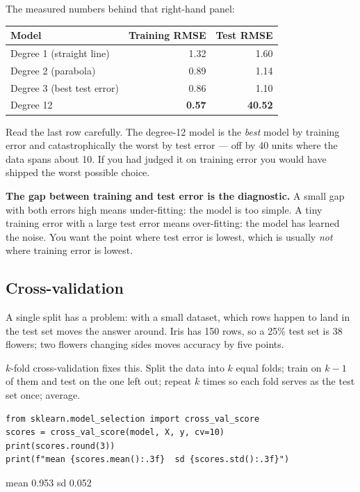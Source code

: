 \documentclass[11pt]{article}
\begin{document}
The measured numbers behind that right-hand panel:

\begin{center}
\begin{tabular}{@{}lrr@{}}
\toprule
\textbf{Model} & \textbf{Training RMSE} & \textbf{Test RMSE}\\
\midrule
Degree 1 (straight line)   & 1.32 & 1.60\\
Degree 2 (parabola)        & 0.89 & 1.14\\
Degree 3 (best test error) & 0.86 & 1.10\\
Degree 12                  & \textbf{0.57} & \textbf{40.52}\\
\bottomrule
\end{tabular}
\end{center}

Read the last row carefully. The degree-12 model is the \emph{best} model by
training error and catastrophically the worst by test error --- off by 40 units
where the data spans about 10. If you had judged it on training error you would
have shipped the worst possible choice.

\begin{keyidea}
\textbf{The gap between training and test error is the diagnostic.} A small gap
with both errors high means under-fitting: the model is too simple. A tiny
training error with a large test error means over-fitting: the model has learned
the noise. You want the point where test error is lowest, which is usually
\emph{not} where training error is lowest.
\end{keyidea}

\subsection{Cross-validation}

A single split has a problem: with a small dataset, which rows happen to land in
the test set moves the answer around. Iris has 150 rows, so a 25\% test set is
38 flowers; two flowers changing sides moves accuracy by five points.

$k$-fold cross-validation fixes this. Split the data into $k$ equal folds; train
on $k-1$ of them and test on the one left out; repeat $k$ times so each fold
serves as the test set once; average.

\begin{lstlisting}
from sklearn.model_selection import cross_val_score
scores = cross_val_score(model, X, y, cv=10)
print(scores.round(3))
print(f"mean {scores.mean():.3f}  sd {scores.std():.3f}")
\end{lstlisting}
\begin{codeout}
[1.    0.933 1.    0.933 0.867 0.933 0.867 1.    1.    1.   ]
mean 0.953  sd 0.052
\end{codeout}
\end{document}
